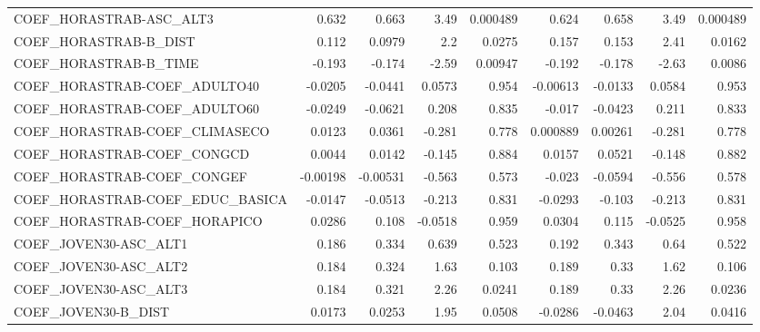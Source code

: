 \begin{tabular}{lrrrrrrrr}
COEF\_HORASTRAB-ASC\_ALT3           &       0.632 &        0.663 &    3.49 & 0.000489 &      0.624 &       0.658 &         3.49 &      0.000489 \\
COEF\_HORASTRAB-B\_DIST             &       0.112 &       0.0979 &     2.2 &   0.0275 &      0.157 &       0.153 &         2.41 &        0.0162 \\
COEF\_HORASTRAB-B\_TIME             &      -0.193 &       -0.174 &   -2.59 &  0.00947 &     -0.192 &      -0.178 &        -2.63 &        0.0086 \\
COEF\_HORASTRAB-COEF\_ADULTO40      &     -0.0205 &      -0.0441 &  0.0573 &    0.954 &   -0.00613 &     -0.0133 &       0.0584 &         0.953 \\
COEF\_HORASTRAB-COEF\_ADULTO60      &     -0.0249 &      -0.0621 &   0.208 &    0.835 &     -0.017 &     -0.0423 &        0.211 &         0.833 \\
COEF\_HORASTRAB-COEF\_CLIMASECO     &      0.0123 &       0.0361 &  -0.281 &    0.778 &   0.000889 &     0.00261 &       -0.281 &         0.778 \\
COEF\_HORASTRAB-COEF\_CONGCD        &      0.0044 &       0.0142 &  -0.145 &    0.884 &     0.0157 &      0.0521 &       -0.148 &         0.882 \\
COEF\_HORASTRAB-COEF\_CONGEF        &    -0.00198 &     -0.00531 &  -0.563 &    0.573 &     -0.023 &     -0.0594 &       -0.556 &         0.578 \\
COEF\_HORASTRAB-COEF\_EDUC\_BASICA   &     -0.0147 &      -0.0513 &  -0.213 &    0.831 &    -0.0293 &      -0.103 &       -0.213 &         0.831 \\
COEF\_HORASTRAB-COEF\_HORAPICO      &      0.0286 &        0.108 & -0.0518 &    0.959 &     0.0304 &       0.115 &      -0.0525 &         0.958 \\
COEF\_JOVEN30-ASC\_ALT1             &       0.186 &        0.334 &   0.639 &    0.523 &      0.192 &       0.343 &         0.64 &         0.522 \\
COEF\_JOVEN30-ASC\_ALT2             &       0.184 &        0.324 &    1.63 &    0.103 &      0.189 &        0.33 &         1.62 &         0.106 \\
COEF\_JOVEN30-ASC\_ALT3             &       0.184 &        0.321 &    2.26 &   0.0241 &      0.189 &        0.33 &         2.26 &        0.0236 \\
COEF\_JOVEN30-B\_DIST               &      0.0173 &       0.0253 &    1.95 &   0.0508 &    -0.0286 &     -0.0463 &         2.04 &        0.0416 \\

\end{tabular}
